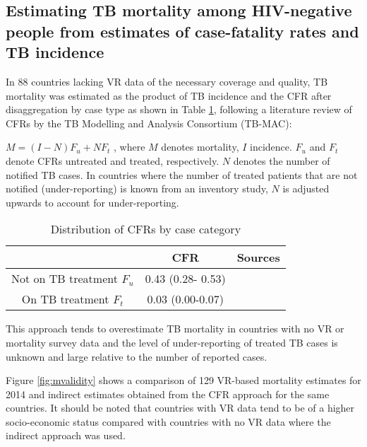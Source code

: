 \subsection{Estimating TB mortality among HIV-negative people from estimates of case-fatality rates and TB incidence
}

In 88 countries lacking VR data of the necessary coverage and quality, TB mortality was estimated as the product of TB incidence and the CFR after disaggregation by case type as shown in Table \ref{tab:cfr}, following a literature review of CFRs by the TB Modelling and Analysis Consortium (TB-MAC):

$M = (I-N)F_u + NF_t$ , where $M$ denotes mortality, $I$ incidence. $F_u$ and $F_t$ denote CFRs untreated and treated, respectively. $N$ denotes the number of notified TB cases. In countries where the number of treated patients that are not notified (under-reporting) is known from an inventory study, $N$ is adjusted upwards to account for under-reporting. 

\begin{table} 
    \begin{tabular}{ c c c }
    \hline
         & CFR & Sources \\ 
         \hline
        Not on TB treatment $F_u$ & 0.43 (0.28- 0.53) &  \cite{12742798} \cite{21483732} \\ 
        On TB treatment $F_t$ & 0.03 (0.00-0.07) &  \cite{21738585} \\ 
        \hline
    \end{tabular} 
    \caption{Distribution of CFRs by case category} 
    \label{tab:cfr}
\end{table}

This approach tends to overestimate TB mortality in countries with no VR or mortality survey data and the level of under-reporting of treated TB cases is unknown and large relative to the number of reported cases. 

Figure \ref{fig:mvalidity} shows a comparison of 129 VR-based mortality estimates for 2014 and indirect estimates obtained from the CFR approach for the same countries. It should be noted that countries with VR data tend to be of a higher socio-economic status compared with countries with no VR data where the indirect approach was used.


